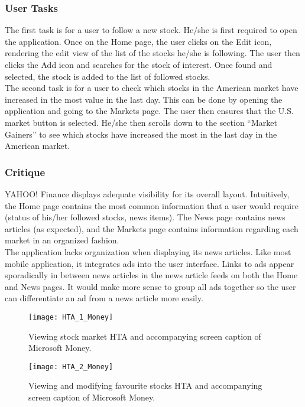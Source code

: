 \documentclass{sigchi}
\begin{document}
\subsubsection{User Tasks}
The first task is for a user to follow a new stock. He/she is first required to open the application. Once on the Home page, the user clicks on the Edit icon, rendering the edit view of the list of the stocks he/she is following. The user then clicks the Add icon and searches for the stock of interest. Once found and selected, the stock is added to the list of followed stocks.\\

The second task is for a user to check which stocks in the American market have increased in the most value in the last day. This can be done by opening the application and going to the Markets page. The user then ensures that the U.S. market button is selected. He/she then scrolls down to the section “Market Gainers” to see which stocks have increased the most in the last day in the American market.


\subsubsection{Critique}
YAHOO! Finance displays adequate visibility for its overall layout. Intuitively, the Home page contains the most common information that a user would require (status of his/her followed stocks, news items). The News page contains news articles (as expected), and the Markets page contains information regarding each market in an organized fashion. \\

The application lacks organization when displaying its news articles. Like most mobile application, it integrates ads into the user interface. Links to ads appear sporadically in between news articles in the news article feeds on both the Home and News pages. It would make more sense to group all ads together so the user can differentiate an ad from a news article more easily. 


\begin{figure*}
	\texttt{[image: HTA\_1\_Money]}
	\caption{Viewing stock market HTA and accompanying screen caption of Microsoft Money.}
	\label{fig:figure1}
\end{figure*}

\begin{figure*}
	\texttt{[image: HTA\_2\_Money]}
	\caption{Viewing and modifying favourite stocks HTA and accompanying screen caption of Microsoft Money.}
	\label{fig:figure2}
\end{figure*}
\end{document}
